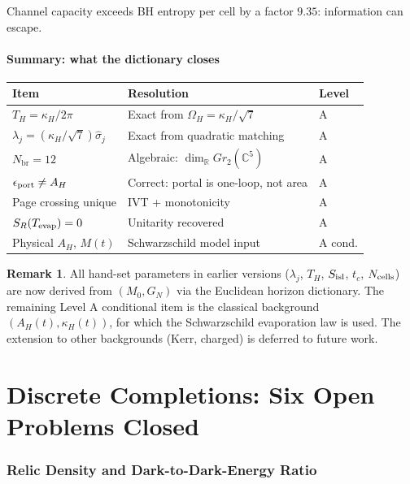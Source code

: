 \documentclass[12pt]{article}
\theoremstyle{plain}
\theoremstyle{definition}
\newtheorem{remark}[theorem]{Remark}
\numberwithin{equation}{section}
\newcommand{\R}{\mathbb{R}}
\newcommand{\C}{\mathbb{C}}
\newcommand{\br}{\mathrm{br}}
\begin{document}
Channel capacity exceeds BH entropy per cell by a factor $9.35$: information can escape.

\subsection{Summary: what the dictionary closes}

\begin{center}
\begin{tabular}{p{4.5cm}p{5cm}p{2cm}}
\toprule
Item & Resolution & Level\\
\midrule
$T_H = \kappa_H/2\pi$ & Exact from $\Omega_H = \kappa_H/\sqrt{7}$ & A\\
$\lambda_j = (\kappa_H/\sqrt{7})\hat{\sigma}_j$ & Exact from quadratic matching & A\\
$N_\br = 12$ & Algebraic: $\dim_\R Gr_2(\C^5)$ & A\\
$\epsilon_{\rm port} \neq A_H$ & Correct: portal is one-loop, not area & A\\
Page crossing unique & IVT + monotonicity & A\\
$S_R(T_{\rm evap}) = 0$ & Unitarity recovered & A\\
Physical $A_H$, $M(t)$ & Schwarzschild model input & A cond.\\
\bottomrule
\end{tabular}
\end{center}

\begin{remark}
All hand-set parameters in earlier versions ($\lambda_j$, $T_H$, $S_{\rm isl}$, $t_c$, $N_{\rm cells}$) are now derived from $(M_0, G_N)$ via the Euclidean horizon dictionary.  The remaining Level A conditional item is the classical background $(A_H(t), \kappa_H(t))$, for which the Schwarzschild evaporation law is used.  The extension to other backgrounds (Kerr, charged) is deferred to future work.
\end{remark}


\part{Discrete Completions: Six Open Problems Closed}

\section{Relic Density and Dark-to-Dark-Energy Ratio}\label{sec:omegaclose}
\end{document}
